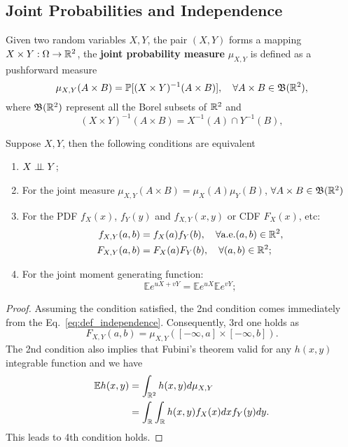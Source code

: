 \subsection{Joint Probabilities and Independence}
\begin{definition}
Given two random variables $X,Y$, the pair $(X,Y)$ forms a mapping $X\times Y:\Omega\to\mathbb{R}^2$, the \textbf{joint probability measure} $\mu_{X,Y}$ is defined as a pushforward measure
\begin{equation}
\mu_{X,Y}(A\times B)=\mathbb{P}[(X\times Y)^{-1}(A\times B)], \quad \forall A\times B\in\mathfrak{B}(\mathbb{R}^2),
\end{equation}
where $\mathfrak{B}(\mathbb{R}^2)$ represent all the Borel subsets of $\mathbb{R}^2$ and
\begin{equation}
(X\times Y)^{-1}(A\times B) = X^{-1}(A)\cap Y^{-1}(B),
\end{equation}
\end{definition}

\begin{theorem}
Suppose $X,Y$, then the following conditions are equivalent
\begin{enumerate}
	\item  $X\perp\!\!\!\perp Y$;
	\item For the joint measure $\mu_{X,Y}(A\times B)=\mu_X(A)\mu_Y(B)$, $\forall A\times B\in\mathfrak{B}(\mathbb{R}^2)$
	\item For the PDF $f_X(x)$, $f_Y(y)$ and $f_{X,Y}(x,y)$ or CDF $F_X(x)$, etc:
	\begin{equation}
	\begin{aligned}
	f_{X,Y}(a,b) &= f_X(a)f_Y(b),\quad \forall\text{a.e.} (a,b)\in\mathbb{R}^2,\\
	F_{X,Y}(a,b) &= F_X(a)F_Y(b),\quad \forall (a,b)\in\mathbb{R}^2;
	\end{aligned}
	\end{equation}
	\item For the joint moment generating function:
	\begin{equation}
	\mathbb{E}e^{uX+vY}=\mathbb{E}e^{uX}\mathbb{E}e^{vY};
	\end{equation}
\end{enumerate}
\end{theorem}
\begin{proof}
Assuming the condition satisfied, the 2nd condition comes immediately from the Eq.~\ref{eq:def_independence}. Consequently, 3rd one holds as 
\begin{equation}
F_{X,Y}(a,b) = \mu_{X,Y}([-\infty,a]\times[-\infty,b]).
\end{equation}
The 2nd condition also implies that Fubini's theorem valid for any $h(x,y)$ integrable function and we have
\begin{equation}
\begin{aligned}
\mathbb{E}h(x,y)&=\int_{\mathbb{R}^2}h(x,y)d\mu_{X,Y}\\
&=\int_{\mathbb{R}} \int_{\mathbb{R}} h(x,y)f_X(x)dx f_Y(y)dy.
\end{aligned}
\end{equation}
This leads to 4th condition holds.
\end{proof}

